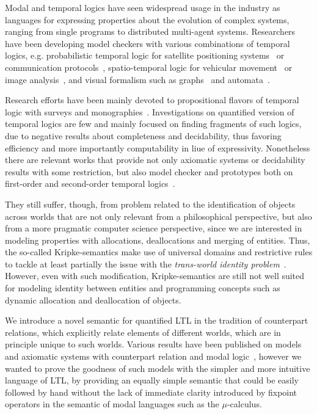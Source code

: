 Modal and temporal logics have seen widespread usage in the industry as languages for expressing properties about the
evolution of complex systems, ranging from single programs to distributed multi-agent systems. Researchers have been
developing model checkers with various combinations of temporal logics, e.g. probabilistic temporal logic for satellite
positioning systems~\cite{lu_availability_2014} or communication protocols~\cite{ammar_formal_2011}, spatio-temporal
logic for vehicular movement~\cite{ciancia_spatio-temporal_2018} or image analysis~\cite{vojnar_voxlogica_2019}, and
visual formalism such as graphs~\cite{fiadeiro_temporal_2007} and automata~\cite{montanari_structured_2005}.

Research efforts have been mainly devoted to propositional flavors of temporal logic with surveys and
monographies~\cite{pnueli_temporal_1977,kroger_temporal_2008}. Investigations on quantified version of temporal logics
are few and mainly focused on finding fragments of such logics, due to negative results about completeness and
decidability, thus favoring efficiency and more importantly computability in liue of expressivity. Nonetheless there are
relevant works that provide not only axiomatic systems or decidability results with some restriction, but also model
checker and prototypes both on first-order and second-order temporal
logics~\cite{boneva_graph_2007,hutchison_model_2006,baeza-yates_model_2002}.

They still suffer, though, from problem related to the identification of objects across worlds that are not only
relevant from a philosophical perspective, but also from a more pragmatic computer science perspective, since we are
interested in modeling properties with allocations, deallocations and merging of entities. Thus, the so-called
Kripke-semantics make use of universal domains and restrictive rules to tackle at least partially the issue with the
\emph{trans-world identity problem}~\cite{lewis_plurality_2001}. However, even with such modification, Kripke-semantics
are still not well suited for modeling identity between entities and programming concepts such as dynamic allocation and
deallocation of objects.

We introduce a novel semantic for quantified \ac{LTL} in the tradition of counterpart relations, which explicitly relate
elements of different worlds, which are in principle unique to such worlds. Various results have been published on
models and axiomatic systems with counterpart relation and modal
logic~\cite{hutchison_counterpart_2010,belardinelli_quantified_2021}, however we wanted to prove the goodness of such
models with the simpler and more intuitive language of \ac{LTL}, by providing an equally simple semantic that could be
easily followed by hand without the lack of immediate clarity introduced by fixpoint operators in the semantic of modal
languages such as the $\mu$-calculus.

